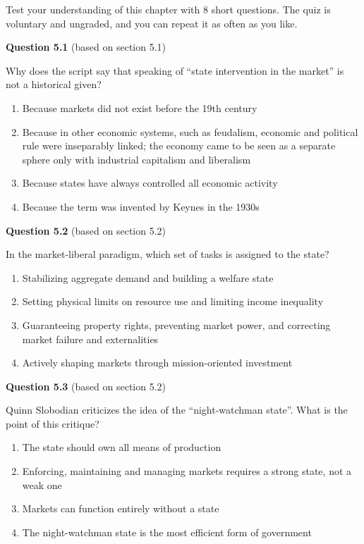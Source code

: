 \documentclass[
  british,
  a4paper,
  DIV=11,
  numbers=noendperiod,
  oneside,
  openany]{scrreprt}
\providecommand{\tightlist}{%
  \setlength{\itemsep}{0pt}\setlength{\parskip}{0pt}}
\begin{document}

Test your understanding of this chapter with 8 short questions. The quiz
is voluntary and ungraded, and you can repeat it as often as you like.

\textbf{Question 5.1} (based on section 5.1)

Why does the script say that speaking of ``state intervention in the
market'' is not a historical given?

\begin{enumerate}
\def\labelenumi{\alph{enumi})}
\tightlist
\item
  Because markets did not exist before the 19th century
\item
  Because in other economic systems, such as feudalism, economic and
  political rule were inseparably linked; the economy came to be seen as
  a separate sphere only with industrial capitalism and liberalism
\item
  Because states have always controlled all economic activity
\item
  Because the term was invented by Keynes in the 1930s
\end{enumerate}

\textbf{Question 5.2} (based on section 5.2)

In the market-liberal paradigm, which set of tasks is assigned to the
state?

\begin{enumerate}
\def\labelenumi{\alph{enumi})}
\tightlist
\item
  Stabilizing aggregate demand and building a welfare state
\item
  Setting physical limits on resource use and limiting income inequality
\item
  Guaranteeing property rights, preventing market power, and correcting
  market failure and externalities
\item
  Actively shaping markets through mission-oriented investment
\end{enumerate}

\textbf{Question 5.3} (based on section 5.2)

Quinn Slobodian criticizes the idea of the ``night-watchman state''.
What is the point of this critique?

\begin{enumerate}
\def\labelenumi{\alph{enumi})}
\tightlist
\item
  The state should own all means of production
\item
  Enforcing, maintaining and managing markets requires a strong state,
  not a weak one
\item
  Markets can function entirely without a state
\item
  The night-watchman state is the most efficient form of government
\end{enumerate}
\end{document}
